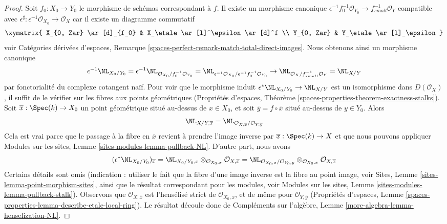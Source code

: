 \begin{proof}
Soit $f_0 : X_0 \to Y_0$ le morphisme de schémas correspondant à $f$.
Il existe un morphisme canonique
$\epsilon^{-1}f_0^{-1}\mathcal{O}_{Y_0} \to f_{small}^{-1}\mathcal{O}_Y$
compatible avec
$\epsilon^\sharp : \epsilon^{-1}\mathcal{O}_{X_0} \to \mathcal{O}_X$
car il existe un diagramme commutatif
$$
\xymatrix{
X_{0, Zar} \ar[d]_{f_0} & X_\etale \ar[l]^\epsilon \ar[d]^f \\
Y_{0, Zar} & Y_\etale \ar[l]_\epsilon
}
$$
voir Catégories dérivées d'espaces, Remarque
\ref{spaces-perfect-remark-match-total-direct-images}.
Nous obtenons ainsi un morphisme canonique
$$
\epsilon^{-1}\NL_{X_0/Y_0} =
\epsilon^{-1}\NL_{\mathcal{O}_{X_0}/f_0^{-1}\mathcal{O}_{Y_0}} =
\NL_{\epsilon^{-1}\mathcal{O}_{X_0}/\epsilon^{-1}f_0^{-1}\mathcal{O}_{Y_0}}
\to
\NL_{\mathcal{O}_X/f^{-1}_{small}\mathcal{O}_Y} = \NL_{X/Y}
$$
par fonctorialité du complexe cotangent naïf.
Pour voir que le morphisme induit $\epsilon^*\NL_{X_0/Y_0} \to \NL_{X/Y}$ est un
isomorphisme dans $D(\mathcal{O}_X)$, il suffit de le vérifier sur les fibres aux points géométriques
(Propriétés d'espaces, Théorème
\ref{spaces-properties-theorem-exactness-stalks}).
Soit $\overline{x} : \Spec(k) \to X_0$
un point géométrique situé au-dessus de $x \in X_0$, et soit
$\overline{y} = f \circ \overline{x}$ situé au-dessus de $y \in Y_0$. Alors
$$
\NL_{X/Y, \overline{x}} =
\NL_{\mathcal{O}_{X, \overline{x}}/\mathcal{O}_{Y, \overline{y}}}
$$
Cela est vrai parce que le passage à la fibre en $\overline{x}$ revient
à prendre l'image inverse par $\overline{x} : \Spec(k) \to X$
et que nous pouvons appliquer Modules sur les sites, Lemme \ref{sites-modules-lemma-pullback-NL}.
D'autre part, nous avons
$$
(\epsilon^*\NL_{X_0/Y_0})_{\overline{x}} =
\NL_{X_0/Y_0, x} \otimes_{\mathcal{O}_{X_0, x}}
\mathcal{O}_{X, \overline{x}} =
\NL_{\mathcal{O}_{X_0, x}/\mathcal{O}_{Y_0, y}}
\otimes_{\mathcal{O}_{X_0, x}} \mathcal{O}_{X, \overline{x}}
$$
Certains détails sont omis (indication : utiliser le fait que la fibre d'une image inverse
est la fibre au point image, voir
Sites, Lemme \ref{sites-lemma-point-morphism-sites},
ainsi que le résultat correspondant pour les modules, voir
Modules sur les sites, Lemme \ref{sites-modules-lemma-pullback-stalk}).
Observons que $\mathcal{O}_{X, \overline{x}}$ est l'hensélisé
strict de $\mathcal{O}_{X_0, x}$, et de même
pour $\mathcal{O}_{Y, \overline{y}}$
(Propriétés d'espaces, Lemme
\ref{spaces-properties-lemma-describe-etale-local-ring}).
Le résultat découle donc de
Compléments sur l'algèbre,
Lemme \ref{more-algebra-lemma-henselization-NL}.
\end{proof}


